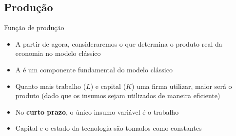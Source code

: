 \documentclass[10pt]{beamer}
\begin{document}
\subsection{Produção}
\begin{frame}{Função de produção}
    \begin{itemize}
        \item A partir de agora, consideraremos o que determina o produto real da economia no modelo clássico\bigskip

        \item A  é um componente fundamental do modelo clássico\medskip

              \begin{center}
                  \begin{minipage}{.8\textwidth}
                  \end{minipage}
              \end{center}\medskip

        \item Quanto mais trabalho ($L$) e capital ($K$) uma firma utilizar, maior será o produto (dado que os insumos sejam utilizados de maneira eficiente)\bigskip

        \item No \textbf{curto prazo}, o único insumo variável é o trabalho\bigskip

        \item Capital e o estado da tecnologia são tomados como constantes
    \end{itemize}
\end{frame}
\end{document}
